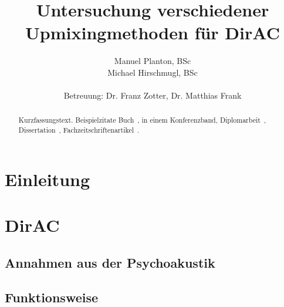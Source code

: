 \documentclass[12pt, a4paper]{article}
\begin{document}

\title{Untersuchung verschiedener Upmixingmethoden für DirAC}

\author{Manuel Planton, BSc \\ Michael Hirschmugl, BSc\\\\\small{Betreuung: Dr. Franz Zotter, Dr. Matthias Frank}}




\maketitle
\newpage
\pagestyle{empty}
\hspace{1cm}\vspace{3cm}

\hspace{1cm}\vspace{1cm}

\begin{abstract}
   Kurzfassungstext. Beispielzitate Buch~\cite{Williams}, in einem Konferenzband\cite{Avizienis06}, Diplomarbeit~\cite{Pomberger08}, Dissertation~\cite{Li05}, Fachzeitschriftenartikel~\cite{Weinreich80}.
\end{abstract}
\newpage
\pagestyle{myheadings}
\hspace{1cm}\vspace{2cm}

\tableofcontents
\newpage

\section{Einleitung}


\section{DirAC}
    \subsection{Annahmen aus der Psychoakustik}
    
    \subsection{Funktionsweise}
    
\end{document}
